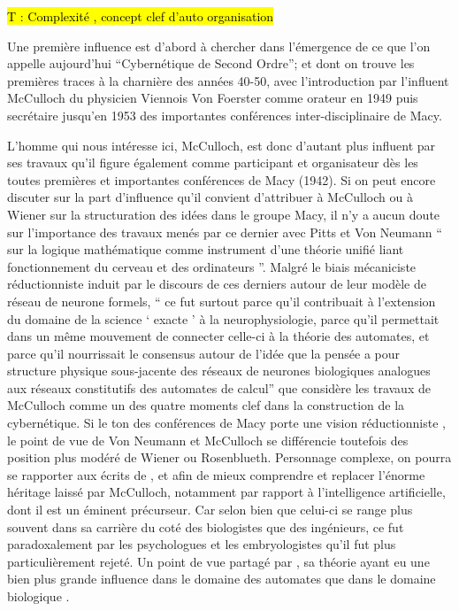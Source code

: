 \hl{T : Complexité , concept clef d'auto organisation }

Une première influence est d'abord à chercher dans l'émergence de ce que l'on appelle aujourd'hui \enquote{Cybernétique de Second Ordre}; et dont on trouve les premières traces à la charnière des années 40-50, avec l'introduction par l'influent McCulloch du physicien Viennois Von Foerster comme orateur en 1949 puis secrétaire jusqu'en 1953 des importantes conférences inter-disciplinaire de Macy.

L'homme qui nous intéresse ici, McCulloch, est donc d'autant plus influent par ses travaux qu'il figure également comme participant et organisateur dès les toutes premières et importantes conférences de Macy (1942). Si on peut encore discuter sur la part d'influence qu'il convient d'attribuer à McCulloch ou à Wiener sur la structuration des idées dans le groupe Macy, il n'y a aucun doute sur l'importance des travaux menés par ce dernier avec Pitts et Von Neumann \enquote{ sur la logique mathématique comme instrument d'une théorie unifié liant fonctionnement du cerveau et des ordinateurs }. Malgré le biais mécaniciste réductionniste \textcite[783-784]{Pouvreau2013} induit par le discours de ces derniers autour de leur modèle de réseau de neurone formels, \enquote{ ce fut surtout parce qu’il contribuait à l’extension du domaine de la science \enquote{ exacte } à la neurophysiologie, parce qu’il permettait dans un même mouvement de connecter celle-ci à la théorie des automates, et parce qu’il nourrissait le consensus autour de l’idée que la pensée a pour structure physique sous-jacente des réseaux de neurones biologiques analogues aux réseaux constitutifs des automates de calcul} que \autocite[777]{Pouvreau2013} considère les travaux de McCulloch comme un des quatre moments clef dans la construction de la cybernétique. Si le ton des conférences de Macy porte une vision réductionniste , le point de vue de Von Neumann et McCulloch se différencie toutefois des position plus modéré de Wiener ou Rosenblueth. Personnage complexe, on pourra se rapporter aux écrits de \textcite{Dupuy2005}, et \textcite{Levy1985} afin de mieux comprendre et replacer l'énorme héritage laissé par McCulloch, notamment par rapport à l'intelligence artificielle, dont il est un éminent précurseur. Car selon \textcite{Dupuy2005} bien que celui-ci se range plus souvent dans sa carrière du coté des biologistes que des ingénieurs, ce fut paradoxalement par les psychologues et les embryologistes qu'il fut plus particulièrement rejeté. Un point de vue partagé par \textcite[778]{Pouvreau2013}, sa théorie ayant eu une bien plus grande influence dans le domaine des automates que dans le domaine biologique .

